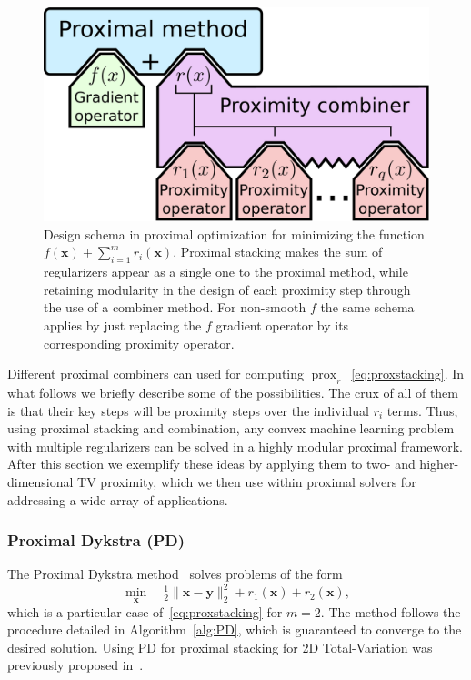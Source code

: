 \documentclass[twoside,11pt]{article}
\newcommand{\vx}{\bm{x}}       \newcommand{\vxh}{\hat{\bm{x}}}        \newcommand{\xh}{\hat{x}}    \newcommand{\vxt}{\tilde{\bm{x}}}       \newcommand{\xt}{\tilde{x}}
\newcommand{\vy}{\bm{y}}       \newcommand{\vyh}{\hat{\bm{y}}}        \newcommand{\yh}{\hat{y}}    \newcommand{\vyt}{\tilde{\bm{y}}}       \newcommand{\yt}{\tilde{y}}
\newcommand{\mynorm}[2]{\| {#1} \|_{#2}}
\newcommand{\enorm}[1]{\mynorm{#1}{2}}
\DeclareMathOperator{\prox}{prox}
\newcommand{\half}{\tfrac{1}{2}}
\numberwithin{equation}{section}
\numberwithin{theorem}{section}
\begin{document}
\begin{figure}[t]
  \centering
  \includegraphics[scale=0.25]{proximalModulesStacking}
  \caption{\small Design schema in proximal optimization for minimizing the function $f(\vx) + \sum_{i=1}^m r_i(\vx)$. Proximal stacking makes the sum of regularizers appear as a single one to the proximal method, while retaining modularity in the design of each proximity step through the use of a combiner method. For non-smooth $f$ the same schema applies by just replacing the $f$ gradient operator by its corresponding proximity operator.
   \label{fig:proximalModulesStacking}
   }
\end{figure}

Different proximal combiners can used for computing $\prox_r$~\eqref{eq:proxstacking}. In what follows we briefly describe some of the possibilities. The crux of all of them is that their key steps will be proximity steps over the individual $r_i$ terms. Thus, using proximal stacking and combination, any convex machine learning problem with multiple regularizers can be solved in a highly modular proximal framework. After this section we exemplify these ideas by applying them to two- and higher-dimensional TV proximity, which we then use within proximal solvers for addressing a wide array of applications.

\subsubsection{Proximal Dykstra (PD)}
\label{sec:PD}
The Proximal Dykstra method~\citep{Combettes09} solves problems of the form
\begin{equation*}
 \min_{\vx} \quad \half \enorm{\vx - \vy}^2 + r_1(\vx) + r_2(\vx),
\end{equation*}
which is a particular case of~\eqref{eq:proxstacking} for $m=2$. The method follows the procedure detailed in Algorithm~\ref{alg:PD}, which is guaranteed to converge to the desired solution. Using PD for proximal stacking for 2D Total-Variation was previously proposed in~\citep{Barbero11}.
\end{document}
